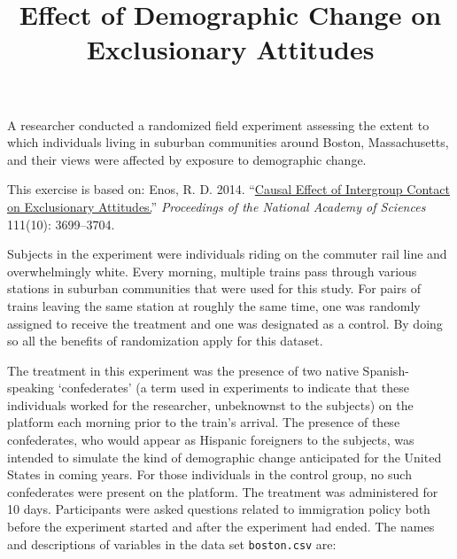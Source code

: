 \documentclass[]{article}
\title{Effect of Demographic Change on Exclusionary Attitudes}
\author{}
\date{}
\begin{document}
\maketitle


A researcher conducted a randomized field experiment assessing the
extent to which individuals living in suburban communities around
Boston, Massachusetts, and their views were affected by exposure to
demographic change.

This exercise is based on: Enos, R. D. 2014.
``\href{http://dx.doi.org/10.1073/pnas.1317670111}{Causal Effect of
Intergroup Contact on Exclusionary Attitudes.}'' \emph{Proceedings of
the National Academy of Sciences} 111(10): 3699--3704.

Subjects in the experiment were individuals riding on the commuter rail
line and overwhelmingly white. Every morning, multiple trains pass
through various stations in suburban communities that were used for this
study. For pairs of trains leaving the same station at roughly the same
time, one was randomly assigned to receive the treatment and one was
designated as a control. By doing so all the benefits of randomization
apply for this dataset.

The treatment in this experiment was the presence of two native
Spanish-speaking `confederates' (a term used in experiments to indicate
that these individuals worked for the researcher, unbeknownst to the
subjects) on the platform each morning prior to the train's arrival. The
presence of these confederates, who would appear as Hispanic foreigners
to the subjects, was intended to simulate the kind of demographic change
anticipated for the United States in coming years. For those individuals
in the control group, no such confederates were present on the platform.
The treatment was administered for 10 days. Participants were asked
questions related to immigration policy both before the experiment
started and after the experiment had ended. The names and descriptions
of variables in the data set \texttt{boston.csv} are:
\end{document}
